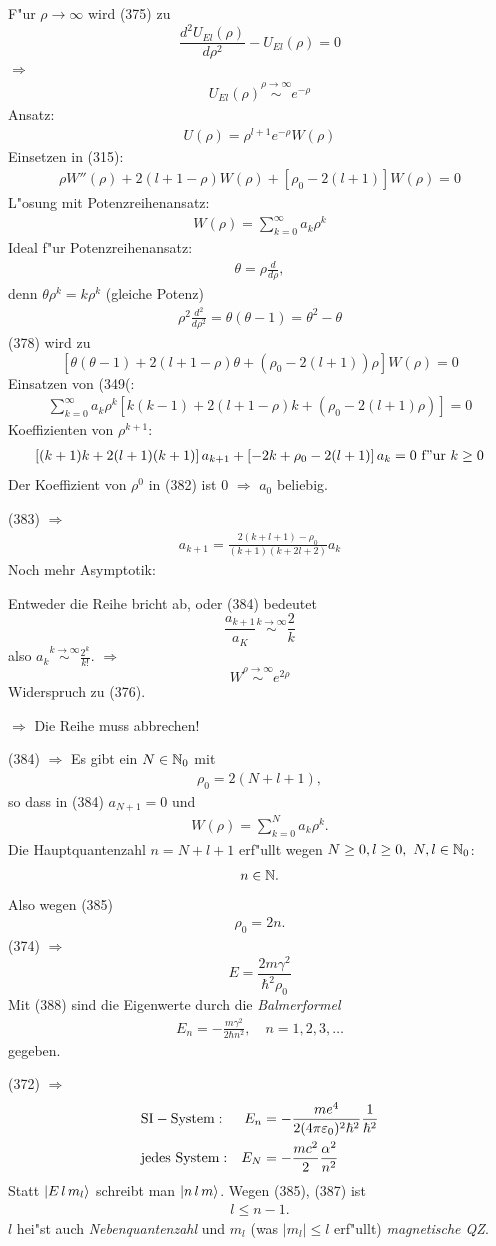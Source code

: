 \documentclass[a4paper]{scrartcl}
\newcommand{\NN}{\ensuremath \mathbb{N}}
\newcommand{\eps}{\ensuremath \varepsilon}
\newcommand{\eqn}[1]{\begin{align} #1 \end{align}}
\begin{document}
{F"ur $\rho \rightarrow \infty$ wird (375) zu 
$$\frac{d^2 U_{E l}(\rho)}{d \rho^2} - U_{El}(\rho) = 0$$
$\Longrightarrow$
\eqn{ U_{E l}(\rho) \stackrel{\rho \rightarrow \infty}\sim e^{- \rho}}
Ansatz: 
\eqn{U(\rho) = \rho^{l+1} e^{-\rho} W(\rho)}
Einsetzen in (315):
\eqn{ \rho W''(\rho) + 2(l+1-\rho) W(\rho) + \left[ \rho_0 - 2(l+1) \right] W(\rho) = 0}
L"osung mit Potenzreihenansatz:
\eqn{W(\rho) = \sum_{k=0}^\infty a_k \rho^k}
Ideal f"ur Potenzreihenansatz:
\eqn{ \theta = \rho \frac d{d\rho},}
denn $\theta \rho^k = k \rho^k$ (gleiche Potenz)
\eqn{\rho^2 \frac{d^2}{d\rho^2} = \theta (\theta -1) = \theta^2 - \theta}
(378) wird zu
$$\left[ \theta (\theta-1) + 2(l +1 - \rho) \theta + (\rho_0 - 2(l+1)) \rho \right] W(\rho) = 0$$
Einsatzen von (349(:
\eqn{ \sum_{k=0}^\infty a_k \rho^k \left[ k(k-1) + 2(l+1-\rho) k + (\rho_0 - 2(l+1) \rho) \right] = 0}
Koeffizienten von $\rho^{k+1}$:
\eqn{ \left[ (k+1) k + 2(l+1) (k+1) \right] a_{k+1} + \left[ -2k + \rho_0 - 2(l+1) \right] a_k = 0 \mathrm{ \ f"ur \ } k \geq 0}
Der Koeffizient von $\rho^0$ in (382) ist $0$ $\Longrightarrow$ $a_0$  beliebig.

(383) $\Longrightarrow$
\eqn{a_{k+1} = \frac{2 (k+l+1) - \rho_0}{(k+1)(k+2l + 2)} a_k}
Noch mehr Asymptotik:

Entweder die Reihe bricht ab, oder (384) bedeutet
$$\frac{ a_{k+1}}{a_K} \stackrel{k \rightarrow \infty}\sim \frac 2k$$
also $a_k \stackrel{k \rightarrow \infty}\sim \frac{2^k}{k!}$. $\Longrightarrow$
$$W \stackrel{\rho \rightarrow \infty}\sim e^{2 \rho}$$
Widerspruch zu (376).

$\Longrightarrow$ Die Reihe muss abbrechen!

(384) $\Longrightarrow$ Es gibt ein $N \in \NN_0$ mit
\eqn{\rho_0 = 2(N+l+1),}
so dass in (384) $a_{N+1} = 0$ und 
\eqn{W(\rho) = \sum_{k=0}^N a_k \rho^k.}
Die Hauptquantenzahl $n = N+l+1$ erf"ullt wegen $N \geq 0, l \geq 0, \ N, l \in \NN_0$:
\eqn{n \in \NN.}
Also wegen (385) 
\eqn{\rho_0 = 2n.}
(374) $\Longrightarrow$
$$E = \frac{2 m \gamma^2}{\hbar^2 \rho_0}$$
Mit (388) sind die Eigenwerte durch die \emph{Balmerformel}
\eqn{E_n = - \frac{m \gamma^2}{2 \hbar n^2}, \quad n=1,2,3,\ldots}
gegeben.

(372) $\Longrightarrow$ 
\eqn{
& \mathrm{SI-System:} & E_n & = -\frac{me^4}{2 (4 \pi \eps_0)^2 \hbar^2} \frac1{\hbar^2} \notag \\
& \mathrm{jedes \ System:} & E_N & = - \frac{mc^2}2 \frac{\alpha^2}{n^2}
}
Statt $\Ket{ E \, l \, m_l}$ schreibt man $\Ket{ n \, l \, m}$. Wegen (385), (387) ist
\eqn{l \leq n -1.}
$l$ hei"st auch \emph{Nebenquantenzahl} und $m_l$ (was $\vert m_l \vert \leq l$ erf"ullt) \emph{magnetische QZ}.

}
\end{document}
